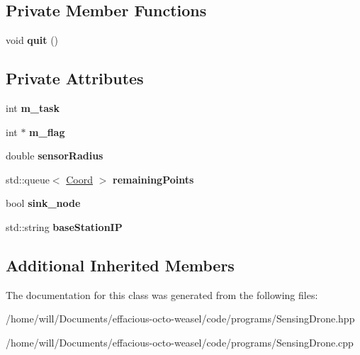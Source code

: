 \subsection*{Private Member Functions}
\begin{DoxyCompactItemize}
\item 
void {\bfseries quit} ()\hypertarget{class_sensing_drone_a4b9e64e52d8a0799b3b6ac50b582459d}{}\label{class_sensing_drone_a4b9e64e52d8a0799b3b6ac50b582459d}

\end{DoxyCompactItemize}
\subsection*{Private Attributes}
\begin{DoxyCompactItemize}
\item 
int {\bfseries m\+\_\+task}\hypertarget{class_sensing_drone_a0ab808e0f445408d687a6e8c7df99bfb}{}\label{class_sensing_drone_a0ab808e0f445408d687a6e8c7df99bfb}

\item 
int $\ast$ {\bfseries m\+\_\+flag}\hypertarget{class_sensing_drone_a18d8f8a0c8c39619bf666a5b95c09d69}{}\label{class_sensing_drone_a18d8f8a0c8c39619bf666a5b95c09d69}

\item 
double {\bfseries sensor\+Radius}\hypertarget{class_sensing_drone_af436a148e5c253474f302d19bc7470c2}{}\label{class_sensing_drone_af436a148e5c253474f302d19bc7470c2}

\item 
std\+::queue$<$ \hyperlink{struct_coord}{Coord} $>$ {\bfseries remaining\+Points}\hypertarget{class_sensing_drone_a801cbf77208053da935f1b6f1ac7bbe8}{}\label{class_sensing_drone_a801cbf77208053da935f1b6f1ac7bbe8}

\item 
bool {\bfseries sink\+\_\+node}\hypertarget{class_sensing_drone_a0175b9aca8019b2476260b905618c959}{}\label{class_sensing_drone_a0175b9aca8019b2476260b905618c959}

\item 
std\+::string {\bfseries base\+Station\+IP}\hypertarget{class_sensing_drone_a8799a866212d7716111ac993ceb5c74b}{}\label{class_sensing_drone_a8799a866212d7716111ac993ceb5c74b}

\end{DoxyCompactItemize}
\subsection*{Additional Inherited Members}


The documentation for this class was generated from the following files\+:\begin{DoxyCompactItemize}
\item 
/home/will/\+Documents/effacious-\/octo-\/weasel/code/programs/Sensing\+Drone.\+hpp\item 
/home/will/\+Documents/effacious-\/octo-\/weasel/code/programs/Sensing\+Drone.\+cpp\end{DoxyCompactItemize}
